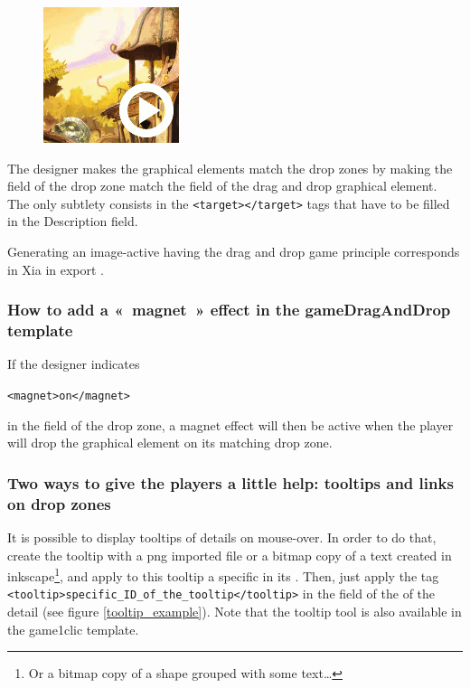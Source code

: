 \begin{figure}
  \centering
  \includegraphics[scale=0.7]{./images/gameDragAndDrop} 
\end{figure}


The designer makes the graphical elements match the drop zones by 
making the  field of the drop zone match
the  field of the drag and drop graphical element. 
The only subtlety consists in the  \verb|<target></target>| tags that have to be filled in the \chemin
{Description} field.

Generating an image-active having the drag and
drop game principle corresponds in Xia in export .



\subsubsection{How to add a «~magnet~» effect in the gameDragAndDrop template}

If the designer indicates\\
\begin{center}
\verb|<magnet>on</magnet>| 
\end{center}
in the  field of the drop zone, a 
magnet effect will then be active when the player will drop the 
graphical element on its matching drop zone.

\subsubsection{Two ways to give the players a little help: tooltips and links on drop zones}

It is possible to display tooltips of details on mouse-over. In order to do that, 
create the tooltip with a png imported file or a bitmap copy of a text created in 
inkscape\footnote{Or a bitmap copy of a shape grouped with some text\ldots}, and 
apply to this tooltip a specific  in its . Then, 
just apply the tag \verb|<tooltip>specific_ID_of_the_tooltip</tooltip>| in the 
 field of the  of the detail (see figure \ref{tooltip_example}).
Note that the tooltip tool is also available in the game1clic template.


